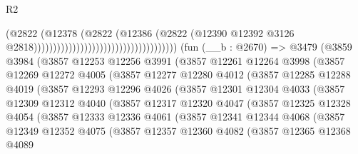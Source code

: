 \begin{lexlean}{R2}
\begin{coremodule}
                                                                  (@2822
                                                                    (@12378
                                                                      (@2822
                                                                        (@12386
                                                                          (@2822
                                                                            (@12390
                                                                              @12392
                                                                              @3126
                                                                              @2818)))))))))))))))))))))))))))))))))))))
    (fun (__b : @2670) =>
    @3479
      (@3859
        @3984
        (@3857
          @12253
          @12256
          @3991
          (@3857
            @12261
            @12264
            @3998
            (@3857
              @12269
              @12272
              @4005
              (@3857
                @12277
                @12280
                @4012
                (@3857
                  @12285
                  @12288
                  @4019
                  (@3857
                    @12293
                    @12296
                    @4026
                    (@3857
                      @12301
                      @12304
                      @4033
                      (@3857
                        @12309
                        @12312
                        @4040
                        (@3857
                          @12317
                          @12320
                          @4047
                          (@3857
                            @12325
                            @12328
                            @4054
                            (@3857
                              @12333
                              @12336
                              @4061
                              (@3857
                                @12341
                                @12344
                                @4068
                                (@3857
                                  @12349
                                  @12352
                                  @4075
                                  (@3857
                                    @12357
                                    @12360
                                    @4082
                                    (@3857
                                      @12365
                                      @12368
                                      @4089

\end{coremodule}
\end{lexlean}
